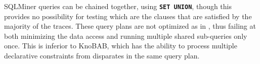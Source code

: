 SQLMiner queries can be chained together, using \texttt{\textbf{SET UNION}}, though this provides no {possibility for testing which are the clauses that are satisfied by the majority of the traces.} These query plans are not optimized as in \cite{BellatrecheKB21}, thus failing at both minimizing the data access
and running multiple shared sub-queries only once.
This is inferior to KnoBAB, which has the ability to process multiple 
declarative constraints from disparates in the same query plan.
